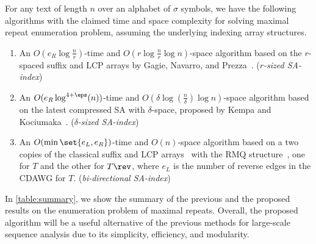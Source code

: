 \begin{theorem}\label{thm:old:algo:maxrep:derived}
For any text of length $n$ over an alphabet of $\sigma$ symbols, we have the following algorithms with the claimed time and space complexity for solving maximal repeat enumeration problem, assuming the underlying indexing array structures. 
\begin{enumerate}[1.]

\item An $O(e_R \log {\frac n r})$-time and $O(r\log {\frac n r}\log n)$-space algorithm based on the $r$-spaced suffix and LCP arrays by Gagie, Navarro, and Prezza~\cite{gagie:navarro:prezza2020fully}. 
(\textit{$r$-sized SA-index})

\item An $O(e_R \log^{4+\eps}(n))$-time and $O(\delta\log({\frac n \delta}) \log n)$-space algorithm based on the latest compressed SA with $\delta$-space, proposed by Kempa and Kociumaka~\cite{kempa:kociumaka2023collapsing}. 
(\textit{$\delta$-sized SA-index})

\item An $O(\min\set{e_L, e_R})$-time and $O(n)$-space algorithm based on a two copies of the classical suffix and LCP arrays~\cite{manber:myers1993suffixarrays} with the RMQ structure~\cite{bender:colton2000thelcaproblem}, one for $T$ and the other for $T\rev$, where $e_L$  is the number of reverse edges in the CDAWG for $T$.  (\textit{bi-directional SA-index})
\label{it:algo:maxrep:bidirect}
\end{enumerate}
\end{theorem}


In \cref{table:summary}, we show the summary of the previous and the proposed results on the enumeration problem of maximal repeats.
Overall, the proposed algorithm will be a useful alternative of the previous methods for large-scale sequence analysis due to its simplicity, efficiency, and modularity. 


